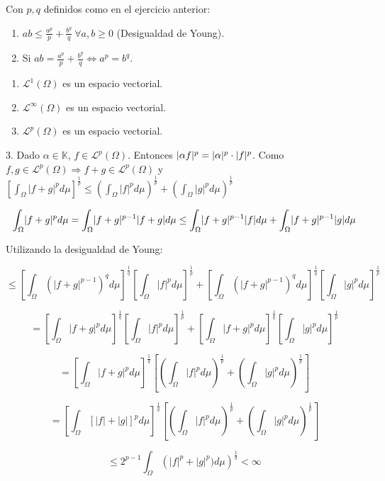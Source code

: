 \begin{ejer}
  Con $p, q$ definidos como en el ejercicio anterior:
  \begin{enumerate}
  \item $ \displaystyle ab \leq \frac{a^p}{p} + \frac{b^q}{q} \ \forall a, b \geq 0$ (Desigualdad de Young).
  \item Si $ \displaystyle ab = \frac{a^p}{p} + \frac{b^q}{q} \Leftrightarrow a^p = b^q$.
  \end{enumerate}
\end{ejer}

\begin{ejer}
  \begin{enumerate}
  \item $\mathcal L^{1} (\Omega)$ es un espacio vectorial.
  \item $\mathcal L^{\infty} (\Omega)$ es un espacio vectorial.
  \item $\mathcal L^{p} (\Omega)$ es un espacio vectorial.
  \end{enumerate}


\end{ejer}

\begin{sol}

    3.
    Dado $\alpha \in \mathbb K$, $f \in \mathcal L^p (\Omega)$. Entonces $\lvert\alpha f\rvert^p = \lvert\alpha\rvert^p \cdot \lvert f\rvert^p$.
    Como $f, g \in \mathcal L^p(\Omega) \Rightarrow f + g \in \mathcal L^p(\Omega)$ y $ \displaystyle \left[ \int_{\Omega} |f+g|^{p} d \mu \right]^{\frac{1}{p}} \leq \left( \int_{\Omega} |f|^{p} d \mu \right)^{\frac{1}{p}} + \left( \int_{\Omega} |g|^{p} d \mu \right)^{\frac{1}{p}}$

    $$\int_{\Omega} \lvert f+g\rvert^p d \mu = \int_{\Omega}\lvert f+g\rvert^{p-1} \lvert f+g\rvert d \mu \leq \int_{\Omega} \lvert f+g\rvert^{p-1} \lvert f\rvert d \mu + \int_{\Omega} \lvert f+g\rvert^{p-1} \lvert g\rvert d \mu$$

    Utilizando la desigualdad de Young:

    $$\leq \left[ \int_{\Omega} \left( |f+g|^{p-1} \right)^q d \mu \right]^{\frac{1}{q}} \left[ \int_{\Omega} |f|^{p} d \mu \right]^{\frac{1}{p}} + \left[ \int_{\Omega} \left( |f+g|^{p-1} \right)^q d \mu \right]^{\frac{1}{q}} \left[ \int_{\Omega} |g|^{p} d \mu \right]^{\frac{1}{p}}$$

    $$= \left[ \int_{\Omega} |f+g|^{p} d \mu \right]^{\frac{1}{q}} \left[ \int_{\Omega} |f|^{p} d \mu \right]^{\frac{1}{p}} + \left[ \int_{\Omega} |f+g|^{p} d \mu \right]^{\frac{1}{q}} \left[ \int_{\Omega} |g|^{p} d \mu \right]^{\frac{1}{p}}$$

    $$= \left[ \int_{\Omega} |f+g|^{p} d \mu \right]^{\frac{1}{q}} \left[ \left( \int_{\Omega} |f|^{p} d \mu \right)^{\frac{1}{p}} + \left( \int_{\Omega} |g|^{p} d \mu \right)^{\frac{1}{p}} \right]$$

    $$= \left[ \int_{\Omega} \left[ |f|+|g| \right]^{p} d \mu \right]^{\frac{1}{q}} \left[ \left( \int_{\Omega} |f|^{p} d \mu \right)^{\frac{1}{p}} + \left( \int_{\Omega} |g|^{p} d \mu \right)^{\frac{1}{p}} \right]$$

    $$ \leq 2^{p-1} \int_{\Omega} \left( |f|^p + |g|^p) d \mu \right)^{\frac{1}{q}} < \infty$$

  \end{sol}


